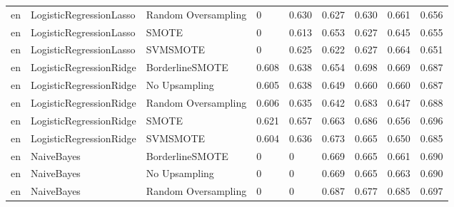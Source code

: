 \begin{tabular}{lllllllll}
      en &      LogisticRegressionLasso & Random Oversampling &     0 &                     0.630 &                 0.627 &                  0.630 &                                   0.661 &     0.656 \\
      en &      LogisticRegressionLasso &               SMOTE &     0 &                     0.613 &                 0.653 &                  0.627 &                                   0.645 &     0.655 \\
      en &      LogisticRegressionLasso &            SVMSMOTE &     0 &                     0.625 &                 0.622 &                  0.627 &                                   0.664 &     0.651 \\
      en &      LogisticRegressionRidge &     BorderlineSMOTE & 0.608 &                     0.638 &                 0.654 &                  0.698 &                                   0.669 &     0.687 \\
      en &      LogisticRegressionRidge &       No Upsampling & 0.605 &                     0.638 &                 0.649 &                  0.660 &                                   0.660 &     0.687 \\
      en &      LogisticRegressionRidge & Random Oversampling & 0.606 &                     0.635 &                 0.642 &                  0.683 &                                   0.647 &     0.688 \\
      en &      LogisticRegressionRidge &               SMOTE & 0.621 &                     0.657 &                 0.663 &                  0.686 &                                   0.656 &     0.696 \\
      en &      LogisticRegressionRidge &            SVMSMOTE & 0.604 &                     0.636 &                 0.673 &                  0.665 &                                   0.650 &     0.685 \\
      en &                   NaiveBayes &     BorderlineSMOTE &     0 &                         0 &                 0.669 &                  0.665 &                                   0.661 &     0.690 \\
      en &                   NaiveBayes &       No Upsampling &     0 &                         0 &                 0.669 &                  0.665 &                                   0.663 &     0.690 \\
      en &                   NaiveBayes & Random Oversampling &     0 &                         0 &                 0.687 &                  0.677 &                                   0.685 &     0.697 \\

\end{tabular}
